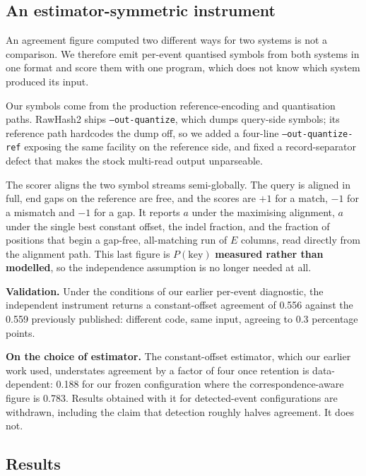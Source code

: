 \documentclass[conference]{IEEEtran}
\begin{document}
\subsection{An estimator-symmetric instrument}

An agreement figure computed two different ways for two systems is not a comparison. We
therefore emit per-event quantised symbols from both systems in one format and score them with
one program, which does not know which system produced its input.

Our symbols come from the production reference-encoding and quantisation paths. RawHash2 ships
\texttt{--out-quantize}, which dumps query-side symbols; its reference path hardcodes the dump
off, so we added a four-line \texttt{--out-quantize-ref} exposing the same facility on the
reference side, and fixed a record-separator defect that makes the stock multi-read output
unparseable.

The scorer aligns the two symbol streams semi-globally. The query is aligned in full, end gaps
on the reference are free, and the scores are $+1$ for a match, $-1$ for a mismatch and $-1$
for a gap. It reports $a$ under the maximising alignment, $a$ under the single best constant
offset, the indel fraction, and the fraction of positions that begin a gap-free, all-matching
run of $E$ columns, read directly from the alignment path. This last figure is
$P(\mathrm{key})$ \textbf{measured rather than modelled}, so the independence assumption is no
longer needed at all.

\textbf{Validation.} Under the conditions of our earlier per-event diagnostic, the independent
instrument returns a constant-offset agreement of 0.556 against the 0.559 previously published:
different code, same input, agreeing to 0.3 percentage points.

\textbf{On the choice of estimator.} The constant-offset estimator, which our earlier work used,
understates agreement by a factor of four once retention is data-dependent: 0.188 for our frozen
configuration where the correspondence-aware figure is 0.783. Results obtained with it for
detected-event configurations are withdrawn, including the claim that detection roughly halves
agreement. It does not.

\subsection{Results}
\end{document}

